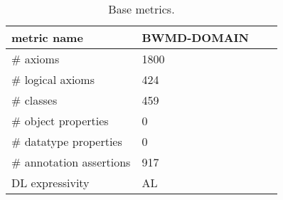 \begin{table}
\centering
\caption{Base metrics.}
\label{tab:base-metrics}
\begin{tabular}{p{3.5cm}|p{1.2cm}p{1.2cm}p{1.2cm}}
\toprule
             metric name & BWMD-DOMAIN \\
\midrule
                \# axioms &        1800 \\
        \# logical axioms &         424 \\
               \# classes &         459 \\
     \# object properties &           0 \\
   \# datatype properties &           0 \\
 \# annotation assertions &         917 \\
         DL expressivity &          AL \\
\bottomrule
\end{tabular}
\end{table}
